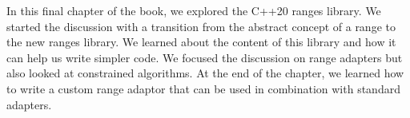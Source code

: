 In this final chapter of the book, we explored the C++20 ranges library. We started the discussion with a transition from the abstract concept of a range to the new ranges library. We learned about the content of this library and how it can help us write simpler code. We focused the discussion on range adapters but also looked at constrained algorithms. At the end of the chapter, we learned how to write a custom range adaptor that can be used in combination with standard adapters.